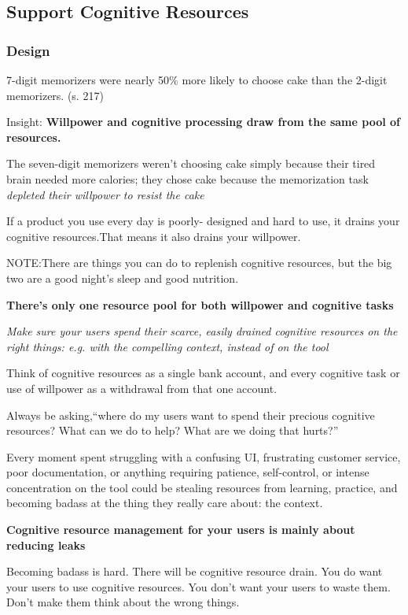 \subsection{Support Cognitive Resources}
\subsubsection{Design}
7-digit memorizers were nearly 50\% more likely to choose cake than the 2-digit memorizers. (s. 217)

Insight: \textbf{Willpower and cognitive processing draw from the same pool of resources.}

The seven-digit memorizers weren’t choosing cake simply because their tired brain needed more calories; they chose cake because the memorization task \textit{depleted their willpower to resist the cake}

If a product you use every day is poorly- designed and hard to use, it drains your cognitive resources.That means it also drains your willpower.

NOTE:There are things you can do to replenish cognitive resources, but the big two are a good night’s sleep and good nutrition.

\textbf{There’s only one resource pool for both willpower and cognitive tasks}

\textit{Make sure your users spend their scarce, easily drained cognitive resources on the right things: e.g. with the compelling context, instead of on the tool}

Think of cognitive resources as a single bank account, and every cognitive task or use of willpower as a withdrawal from that one account.

Always be asking,“where do my users want to spend their precious cognitive resources? What can we do to help? What are we doing that hurts?”

Every moment spent struggling with a confusing UI, frustrating customer service, poor documentation, or anything requiring patience, self-control, or intense concentration on the tool could be stealing resources from learning, practice, and becoming badass at the thing they really care about: the context.

\textbf{Cognitive resource management for your users is mainly about reducing leaks}

Becoming badass is hard.
There will be cognitive resource drain.
You do want your users to use cognitive resources. You don’t want your users to waste them.
Don’t make them think about the wrong things.

